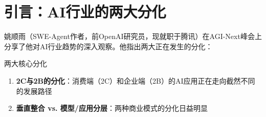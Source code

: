 \section{引言：AI行业的两大分化}

姚顺雨（SWE-Agent作者，前OpenAI研究员，现就职于腾讯）在AGI-Next峰会上分享了他对AI行业趋势的深入观察。他指出两大正在发生的分化：

\begin{importantbox}{两大核心分化}
\begin{enumerate}
\item \textbf{2C与2B的分化}：消费端（2C）和企业端（2B）的AI应用正在走向截然不同的发展路径
\item \textbf{垂直整合 vs. 模型/应用分层}：两种商业模式的分化日益明显
\end{enumerate}
\end{importantbox}


